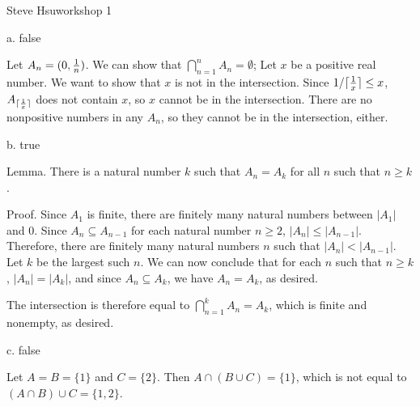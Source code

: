 \def\ceil#1{\lceil{#1}\rceil}
{\noindent Steve Hsu\hfill workshop 1}

\item{a.} false

Let $A_n = (0, {1\over n})$.
We can show that $\bigcap_{n=1}^n A_n = \emptyset$;
Let $x$ be a positive real number.
We want to show that $x$ is not in the intersection.
Since $1 / \ceil{1\over x} \le x$,
$A_{\ceil{1\over x}}$ does not contain $x$,
so $x$ cannot be in the intersection.
There are no nonpositive numbers in any $A_n$,
so they cannot be in the intersection, either.

\item{b.} true

Lemma. There is a natural number $k$ such that
$A_n = A_k$ for all $n$ such that $n \ge k$.

Proof. Since $A_1$ is finite,
there are finitely many natural numbers between $|A_1|$ and $0$.
Since $A_n \subseteq A_{n-1}$ for each natural number $n \ge 2$,
$|A_n| \le |A_{n-1}|$.
Therefore, there are finitely many natural numbers $n$ such that
$|A_n| < |A_{n-1}|$.
Let $k$ be the largest such $n$.
We can now conclude that for each $n$ such that $n \ge k$,
$|A_n| = |A_k|$, and since $A_n \subseteq A_k$,
we have $A_n = A_k$, as desired.

The intersection is therefore equal to
$\bigcap_{n=1}^k A_n = A_k$,
which is finite and nonempty, as desired.

\item{c.} false

Let $A = B = \{1\}$ and $C = \{2\}$.
Then $A \cap (B \cup C) = \{1\}$,
which is not equal to
$(A \cap B) \cup C = \{1,2\}$.
\bye
